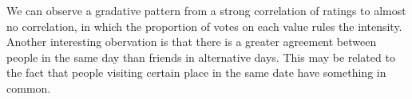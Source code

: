 We can observe a gradative pattern from a strong correlation of ratings to
almost no correlation, in which the proportion of votes on each value rules
the intensity. Another interesting obervation is that there is a greater
agreement between people in the same day than friends in alternative days. This
may be related to the fact that people visiting certain place in the same date
have something in common.
